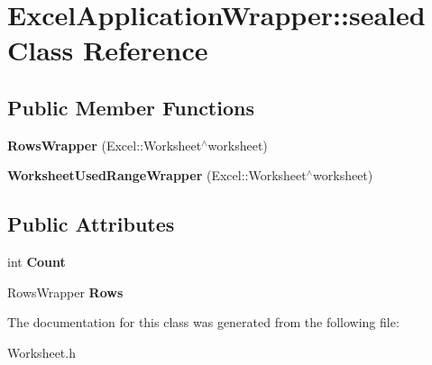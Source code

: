 \hypertarget{class_excel_application_wrapper_1_1sealed}{}\section{Excel\+Application\+Wrapper\+:\+:sealed Class Reference}
\label{class_excel_application_wrapper_1_1sealed}
\subsection*{Public Member Functions}
\begin{DoxyCompactItemize}
\item 
\hypertarget{class_excel_application_wrapper_1_1sealed_a3eee1202ad9411ff8c074be8cf304544}{}{\bfseries Rows\+Wrapper} (Excel\+::\+Worksheet$^\wedge$worksheet)\label{class_excel_application_wrapper_1_1sealed_a3eee1202ad9411ff8c074be8cf304544}

\item 
\hypertarget{class_excel_application_wrapper_1_1sealed_afee25a460af0c3ad4477dff855ecf43d}{}{\bfseries Worksheet\+Used\+Range\+Wrapper} (Excel\+::\+Worksheet$^\wedge$worksheet)\label{class_excel_application_wrapper_1_1sealed_afee25a460af0c3ad4477dff855ecf43d}

\end{DoxyCompactItemize}
\subsection*{Public Attributes}
\begin{DoxyCompactItemize}
\item 
\hypertarget{class_excel_application_wrapper_1_1sealed_aa342606153482898eb46b7f97f86c237}{}int {\bfseries Count}\label{class_excel_application_wrapper_1_1sealed_aa342606153482898eb46b7f97f86c237}

\item 
\hypertarget{class_excel_application_wrapper_1_1sealed_aea009ca9dbd64f39cae7d77623b92e77}{}Rows\+Wrapper {\bfseries Rows}\label{class_excel_application_wrapper_1_1sealed_aea009ca9dbd64f39cae7d77623b92e77}

\end{DoxyCompactItemize}


The documentation for this class was generated from the following file\+:\begin{DoxyCompactItemize}
\item 
Worksheet.\+h\end{DoxyCompactItemize}

